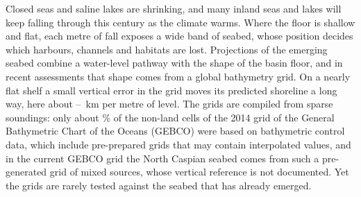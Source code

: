 
Closed seas and saline lakes are shrinking\citep{wurtsbaugh2017,yao2023}, and many inland seas and lakes will keep falling through this century as the climate warms\citep{prange2020}. Where the floor is shallow and flat, each metre of fall exposes a wide band of seabed, whose position decides which harbours, channels and habitats are lost. Projections of the emerging seabed combine a water-level pathway with the shape of the basin floor, and in recent assessments that shape comes from a global bathymetry grid\citep{court2025,duan2025}. On a nearly flat shelf a small vertical error in the grid moves its predicted shoreline a long way, here about --~km per metre of level. The grids are compiled from sparse soundings: only about \% of the non-land cells of the 2014 grid of the General Bathymetric Chart of the Oceans (GEBCO) were based on bathymetric control data, which include pre-prepared grids that may contain interpolated values\citep{weatherall2015}, and in the current GEBCO grid the North Caspian seabed comes from such a pre-generated grid of mixed sources, whose vertical reference is not documented\citep{gebco2026}. Yet the grids are rarely tested against the seabed that has already emerged.

